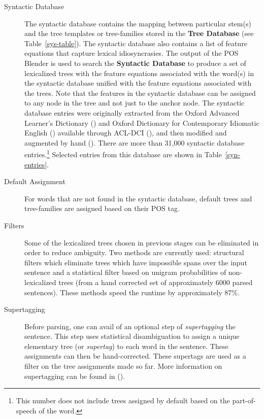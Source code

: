 \begin{description}
\item[Syntactic Database] The syntactic database contains the mapping 
  between particular stem(s) and the tree templates or tree-families 
  stored in the {\bf Tree Database} (see Table~\ref{sys-table}). The 
  syntactic database also contains a list of feature equations that 
  capture lexical idiosyncrasies. The output of the POS Blender is 
  used to search the {\bf Syntactic Database} to produce a set of 
  lexicalized trees with the feature equations associated with the 
  word(s) in the syntactic database unified with the feature equations 
  associated with the trees. Note that the features in the syntactic 
  database can be assigned to any node in the tree and not just to the 
  anchor node. The syntactic database entries were originally 
  extracted from the Oxford Advanced Learner's Dictionary 
  (\cite{oald74}) and Oxford Dictionary for Contemporary Idiomatic 
  English (\cite{cie75}) available through ACL-DCI 
  (\cite{liberman89}), and then modified and augmented by hand 
  (\cite{EgediMartin94}).  There are more than 31,000 syntactic 
  database entries.\footnote{This number does not include trees     assigned by default based on the part-of-speech of the word.} 
  Selected entries from this database are shown in 
  Table~\ref{syn-entries}. 
    
\item[Default Assignment] For words that are not found in the 
  syntactic database, default trees and tree-families are assigned 
  based on their POS tag. 
  
\item[Filters] Some of the lexicalized trees chosen in previous stages 
  can be eliminated in order to reduce ambiguity. Two methods are 
  currently used: structural filters which eliminate trees which have 
  impossible spans over the input sentence and a statistical filter 
  based on unigram probabilities of non-lexicalized trees (from a hand 
  corrected set of approximately 6000 parsed sentences). These methods 
  speed the runtime by approximately 87\%. 
  
\item[Supertagging] Before parsing, one can avail of an optional step 
  of {\em supertagging} the sentence. This step uses statistical 
  disambiguation to assign a unique elementary tree (or {\em     supertag}) to each word in the sentence. These assignments can 
  then be hand-corrected. These supertags are used as a filter on the 
  tree assignments made so far. More information on supertagging can 
  be found in (\cite{srini97diss,srini97iwpt}). 
 
\end{description} 
 
